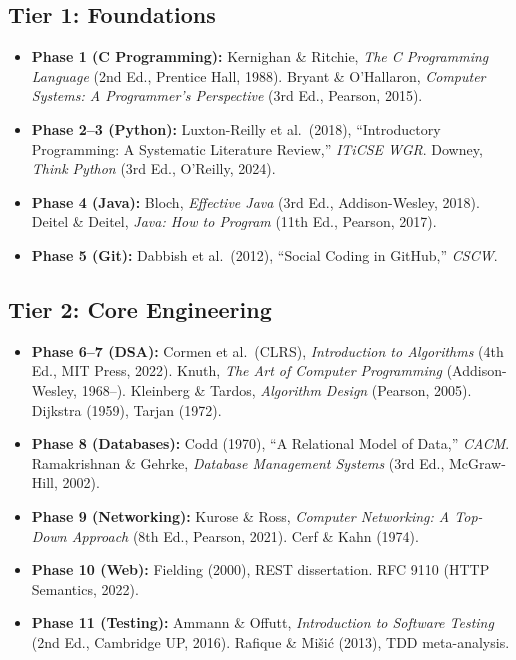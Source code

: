 \documentclass[11pt, a4paper, oneside]{report}
\begin{document}
{{{{{{{{{{{{\subsection*{Tier 1: Foundations}
\begin{itemize}[leftmargin=*]
\item \textbf{Phase 1 (C Programming):} Kernighan \& Ritchie, \emph{The C Programming Language} (2nd Ed., Prentice Hall, 1988). Bryant \& O'Hallaron, \emph{Computer Systems: A Programmer's Perspective} (3rd Ed., Pearson, 2015).
\item \textbf{Phase 2--3 (Python):} Luxton-Reilly et al.\ (2018), ``Introductory Programming: A Systematic Literature Review,'' \emph{ITiCSE WGR}. Downey, \emph{Think Python} (3rd Ed., O'Reilly, 2024).
\item \textbf{Phase 4 (Java):} Bloch, \emph{Effective Java} (3rd Ed., Addison-Wesley, 2018). Deitel \& Deitel, \emph{Java: How to Program} (11th Ed., Pearson, 2017).
\item \textbf{Phase 5 (Git):} Dabbish et al.\ (2012), ``Social Coding in GitHub,'' \emph{CSCW}.
\end{itemize}

\subsection*{Tier 2: Core Engineering}
\begin{itemize}[leftmargin=*]
\item \textbf{Phase 6--7 (DSA):} Cormen et al.\ (CLRS), \emph{Introduction to Algorithms} (4th Ed., MIT Press, 2022). Knuth, \emph{The Art of Computer Programming} (Addison-Wesley, 1968--). Kleinberg \& Tardos, \emph{Algorithm Design} (Pearson, 2005). Dijkstra (1959), Tarjan (1972).
\item \textbf{Phase 8 (Databases):} Codd (1970), ``A Relational Model of Data,'' \emph{CACM}. Ramakrishnan \& Gehrke, \emph{Database Management Systems} (3rd Ed., McGraw-Hill, 2002).
\item \textbf{Phase 9 (Networking):} Kurose \& Ross, \emph{Computer Networking: A Top-Down Approach} (8th Ed., Pearson, 2021). Cerf \& Kahn (1974).
\item \textbf{Phase 10 (Web):} Fielding (2000), REST dissertation. RFC 9110 (HTTP Semantics, 2022).
\item \textbf{Phase 11 (Testing):} Ammann \& Offutt, \emph{Introduction to Software Testing} (2nd Ed., Cambridge UP, 2016). Rafique \& Mi\v{s}i\'c (2013), TDD meta-analysis.
\end{itemize}

}}}}}}}}}}}}
\end{document}

